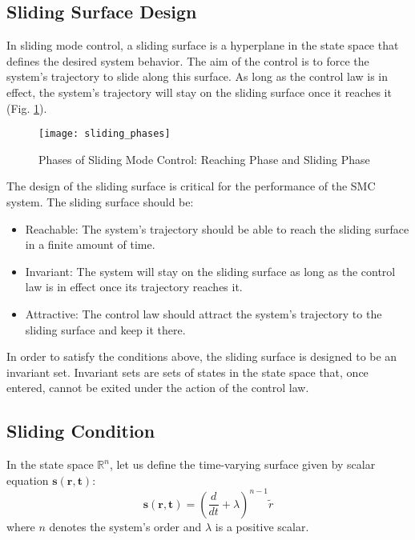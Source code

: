\subsection{Sliding Surface Design}

    In sliding mode control, a sliding surface is a hyperplane in
    the state space that defines the desired system behavior.
    The aim of the control is to force the system's trajectory to slide
    along this surface. As long as the control law is in effect, 
    the system's trajectory will stay on the sliding surface once it reaches it (Fig. \ref{image:sliding_phases}).

    \begin{figure}[H]
        \centering\texttt{[image: sliding\_phases]}
        \caption{Phases of Sliding Mode Control: Reaching Phase and Sliding Phase}
        \label{image:sliding_phases}
    \end{figure}

    The design of the sliding surface is critical for the performance of the SMC
    system. The sliding surface should be:
    \begin{itemize}
        \item Reachable: The system's trajectory should be able to reach the sliding
            surface in a finite amount of time.
        \item Invariant: The system will stay on the sliding surface as long as the 
        control law is in effect once its trajectory reaches it.
        \item Attractive: The control law should attract the system's trajectory to the
            sliding surface and keep it there.
    \end{itemize}

    In order to satisfy the conditions above, the sliding surface is designed to be an invariant set.
    Invariant sets are sets of states in the state space that, once entered, cannot be exited under 
    the action of the control law.

    \subsection{Sliding Condition}
    In the state space $\mathbb{R}^n$, let us define the time-varying surface
    given by scalar equation $\mathbf{s(r, t)}$:
    \begin{equation}
        \mathbf{s(r, t)} = (\frac{d}{dt} + \lambda)^{n-1}\tilde{{r}}
    \end{equation}
    where $n$ denotes the system's order and $\lambda$ is a positive scalar.

